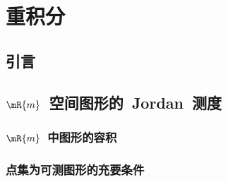 

\chapter{重积分}\label{ch:20}

\section{引\emspace 言}

\section{$\mR{m}$~空间图形的~Jordan~测度}
\subsection{$\mR{m}$~中图形的容积}
\subsection{点集为可测图形的充要条件}

